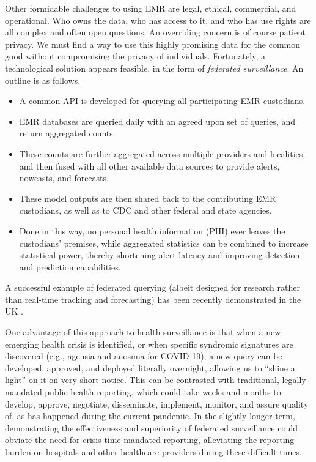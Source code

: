 \documentclass{article}
\begin{document}
Other formidable challenges to using EMR are legal, ethical, commercial, and
operational.  Who owns the data, who has access to it, and who has use rights
are all complex and often open questions.  An overriding concern is of course
patient privacy.  We must find a way to use this highly promising data for the
common good without compromising the privacy of individuals.  Fortunately, a
technological solution appears feasible, in the form of \emph{federated
  surveillance}. An outline is as follows.

\begin{itemize}
\item A common API is developed for querying all participating EMR custodians. 

\item EMR databases are queried daily with an agreed upon set of queries, and
  return aggregated counts.   

\item These counts are further aggregated across multiple providers and
  localities, and then fused with all other available data sources to provide
  alerts, nowcasts, and forecasts. 

\item These model outputs are then shared back to the contributing EMR
  custodians, as well as to CDC and other federal and state agencies.   

\item Done in this way, no personal health information (PHI) ever leaves the
  custodians' premises, while aggregated statistics can be combined to increase
  statistical power, thereby shortening alert latency and improving detection
  and prediction capabilities.
\end{itemize}

A successful example of federated querying (albeit designed for research rather
than real-time tracking and forecasting) has been recently demonstrated in the
UK \citep{Williamson:2020}.

One advantage of this approach to health surveillance is that when a new
emerging health crisis is identified, or when specific syndromic signatures are
discovered (e.g., ageusia and anosmia for COVID-19), a new query can be
developed, approved, and deployed literally overnight, allowing us to ``shine a
light'' on it on very short notice.  This can be contrasted with traditional,
legally-mandated public health reporting, which could take weeks and months to
develop, approve, negotiate, disseminate, implement, monitor, and assure quality
of, as has happened during the current pandemic.  In the slightly longer term,
demonstrating the effectiveness and superiority of federated surveillance could
obviate the need for crisis-time mandated reporting, alleviating the reporting
burden on hospitals and other healthcare providers during these difficult
times. 
\end{document}

